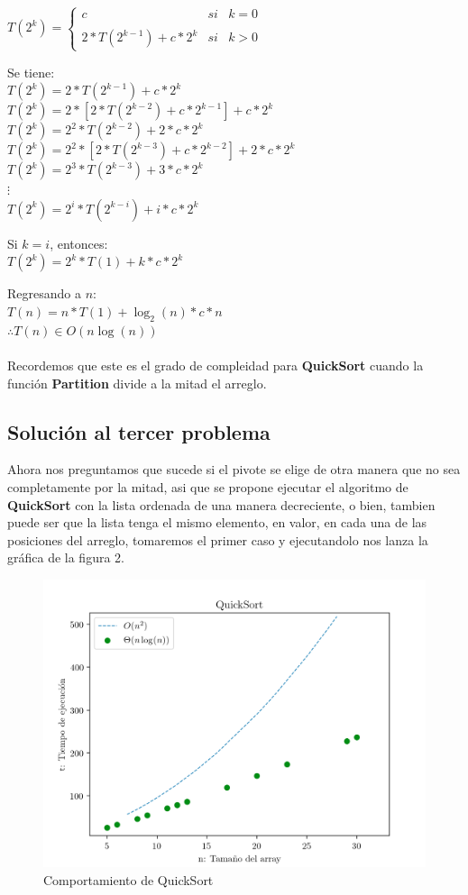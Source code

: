 \documentclass[12pt,twoside]{article}
\begin{document}
\begin{center}
  $T(2^k) =\left\{ \begin{array}{lcc}
      c &   si& k=0\\
  \\  2*T(2^{k-1}) + c*2^k &  si  & k>0 
  \end{array}
  \right.
  $
\end{center}

Se tiene:\\

  $T(2^k)=2*T(2^{k-1}) + c*2^k$\\
  $T(2^k)=2*[2*T(2^{k-2}) + c*2^{k-1}] + c*2^k$\\
  $T(2^k)=2^2*T(2^{k-2}) + 2*c*2^k$\\
  $T(2^k)=2^2*[2*T(2^{k-3}) + c*2^{k-2}] + 2*c*2^k$\\
  $T(2^k)=2^3*T(2^{k-3}) + 3*c*2^k$\\
  $\vdots$\\
  $T(2^k)=2^i*T(2^{k-i}) + i*c*2^k$\\ 
  \centerline{}
  Si $k = i$, entonces:\\
  $T(2^k)=2^k*T(1) + k*c*2^k$\\ 
  \centerline{}
  Regresando a $n$:\\
  $T(n)=n*T(1) + \log_{2}(n)*c*n$\\
  $\therefore T(n) \in O(n \log(n))$\\ \\

Recordemos que este es el grado de compleidad para \textbf{QuickSort} cuando la función \textbf{Partition} divide a la mitad el arreglo. 

\subsection{\textbf{Soluci\'on al tercer problema}}
Ahora nos preguntamos que sucede si el pivote se elige de otra manera que no sea completamente por la mitad, asi que se propone ejecutar el
algoritmo de \textbf{QuickSort} con la lista ordenada de una manera decreciente, o bien, tambien puede ser que la lista tenga el mismo elemento,
en valor, en cada una de las posiciones del arreglo, tomaremos el primer caso y ejecutandolo nos lanza la gráfica de la figura 2.

\begin{figure}
  \centering
    \includegraphics[height=0.5\textwidth]{Figure2}
  \caption{Comportamiento de QuickSort}
  \label{fig:ejemplo3}
\end{figure}
\end{document}
